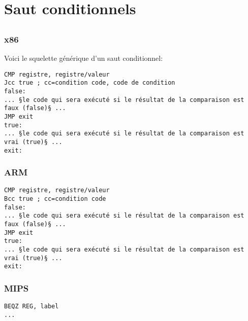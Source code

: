 \section{Saut conditionnels}
\label{sec:Jcc}






\subsection{\Conclusion{}}

\subsubsection{x86}

Voici le squelette générique d'un saut conditionnel:

\begin{lstlisting}[caption=x86,style=customasmx86]
CMP registre, registre/valeur
Jcc true ; cc=condition code, code de condition
false:
... §le code qui sera exécuté si le résultat de la comparaison est faux (false)§ ...
JMP exit 
true:
... §le code qui sera exécuté si le résultat de la comparaison est vrai (true)§ ...
exit:
\end{lstlisting}

\subsubsection{ARM}

\begin{lstlisting}[caption=ARM,style=customasmARM]
CMP registre, registre/valeur
Bcc true ; cc=condition code
false:
... §le code qui sera exécuté si le résultat de la comparaison est faux (false)§ ...
JMP exit 
true:
... §le code qui sera exécuté si le résultat de la comparaison est vrai (true)§ ...
exit:
\end{lstlisting}

\subsubsection{MIPS}

\begin{lstlisting}[caption=Check si zéro (Branch if EQual Zero),style=customasmMIPS]
BEQZ REG, label
...
\end{lstlisting}

